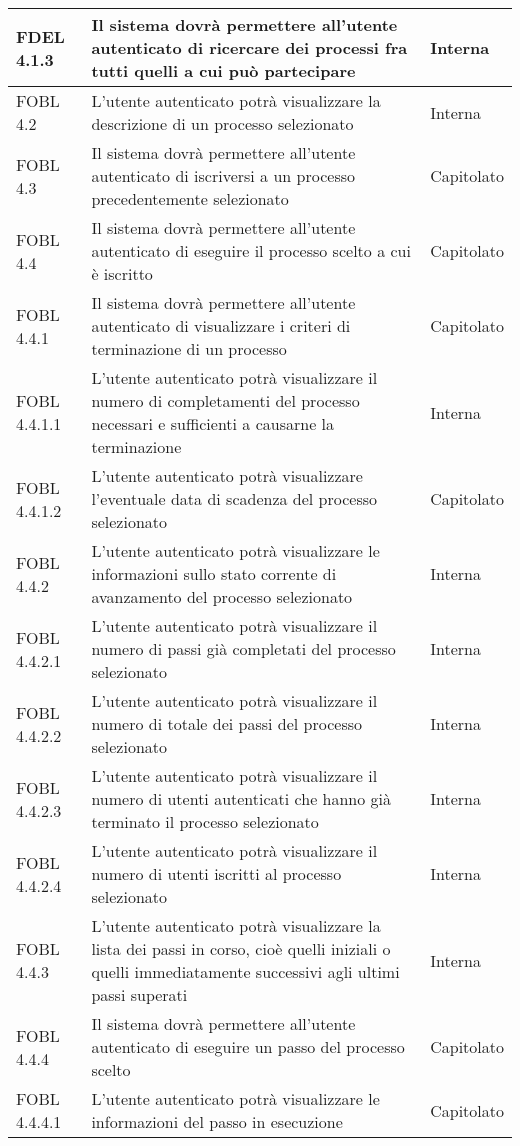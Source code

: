 \begin{longtable}{lXp{}}
\midrule
FDEL 4.1.3&Il sistema dovrà permettere all'utente autenticato di ricercare dei processi fra tutti quelli a cui può partecipare&Interna\\
\midrule
FOBL 4.2&L'utente autenticato potrà visualizzare la descrizione di un processo selezionato&Interna\\
\midrule
FOBL 4.3&Il sistema dovrà permettere all'utente autenticato di iscriversi a un processo precedentemente selezionato&Capitolato\\
\midrule
FOBL 4.4&Il sistema dovrà permettere all'utente autenticato di eseguire il processo scelto a cui è iscritto&Capitolato\\
\midrule
FOBL 4.4.1&Il sistema dovrà permettere all'utente autenticato di visualizzare i criteri di terminazione di un processo&Capitolato\\
\midrule
FOBL 4.4.1.1&L'utente autenticato potrà visualizzare il numero di completamenti del processo necessari e sufficienti a causarne la terminazione&Interna\\
\midrule
FOBL 4.4.1.2&L'utente autenticato potrà visualizzare l'eventuale data di scadenza del processo selezionato&Capitolato\\
\midrule
FOBL 4.4.2&L'utente autenticato potrà visualizzare le informazioni sullo stato corrente di avanzamento del processo selezionato&Interna\\
\midrule
FOBL 4.4.2.1&L'utente autenticato potrà visualizzare il numero di passi già completati del processo selezionato&Interna\\
\midrule
FOBL 4.4.2.2&L'utente autenticato potrà visualizzare il numero di totale dei passi del processo selezionato&Interna\\
\midrule
FOBL 4.4.2.3&L'utente autenticato potrà visualizzare il numero di utenti autenticati che hanno già terminato il processo selezionato&Interna\\
\midrule
FOBL 4.4.2.4&L'utente autenticato potrà visualizzare il numero di utenti iscritti al processo selezionato&Interna\\
\midrule
FOBL 4.4.3&L'utente autenticato potrà visualizzare la lista dei passi in corso, cioè quelli iniziali o quelli immediatamente successivi agli ultimi passi superati &Interna\\
\midrule
FOBL 4.4.4&Il sistema dovrà permettere all'utente autenticato di eseguire un passo del processo scelto&Capitolato\\
\midrule
FOBL 4.4.4.1&L'utente autenticato potrà visualizzare le informazioni del passo in esecuzione&Capitolato\\

\end{longtable}

